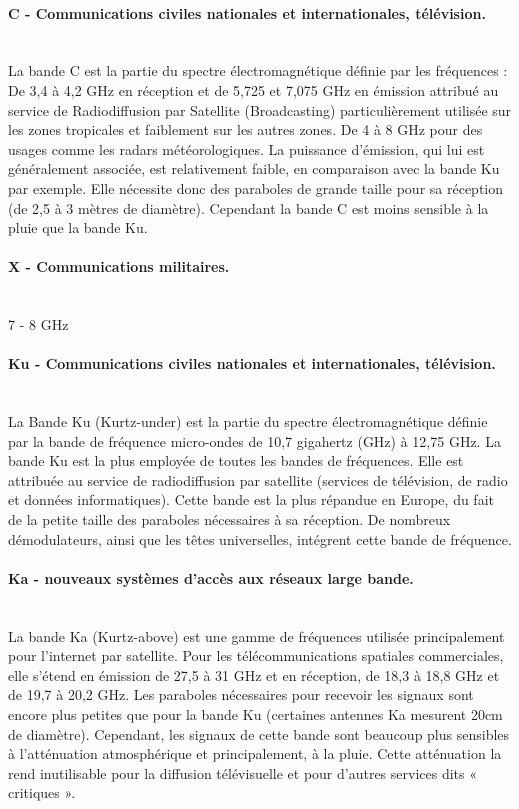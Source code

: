        \paragraph{C - Communications civiles nationales et internationales, télévision.}\\
            La bande C est la partie du spectre électromagnétique définie par les fréquences :
                De 3,4 à 4,2 GHz en réception et de 5,725 et 7,075 GHz en émission attribué au service de Radiodiffusion par Satellite (Broadcasting) particulièrement utilisée sur les zones tropicales et faiblement sur les autres zones.
                De 4 à 8 GHz pour des usages comme les radars météorologiques.
            La puissance d'émission, qui lui est généralement associée, est relativement faible, en comparaison avec la bande Ku par exemple. Elle nécessite donc des paraboles de grande taille pour sa réception (de 2,5 à 3 mètres de diamètre). Cependant la bande C est moins sensible à la pluie que la bande Ku.

        \paragraph{X - Communications militaires.}\\
        7  - 8 GHz  

        \paragraph{Ku - Communications civiles nationales et internationales, télévision.}\\
            La Bande Ku (Kurtz-under) est la partie du spectre électromagnétique définie par la bande de fréquence micro-ondes de 10,7 gigahertz (GHz) à 12,75 GHz. La bande Ku est la plus employée de toutes les bandes de fréquences.
            Elle est attribuée au service de radiodiffusion par satellite (services de télévision, de radio et données informatiques). Cette bande est la plus répandue en Europe, du fait de la petite taille des paraboles nécessaires à sa réception.
            De nombreux démodulateurs, ainsi que les têtes universelles, intégrent cette bande de fréquence.
                        
        \paragraph{Ka - nouveaux systèmes d’accès aux réseaux large bande.}\\
            La bande Ka (Kurtz-above) est une gamme de fréquences utilisée principalement pour l’internet par satellite. Pour les télécommunications spatiales commerciales, elle s’étend en émission de 27,5 à 31 GHz et en réception, de 18,3 à 18,8 GHz et de 19,7 à 20,2 GHz. Les paraboles nécessaires pour recevoir les signaux sont encore plus petites que pour la bande Ku (certaines antennes Ka mesurent 20cm de diamètre). Cependant, les signaux de cette bande sont beaucoup plus sensibles à l’atténuation atmosphérique et principalement, à la pluie. Cette atténuation la rend inutilisable pour la diffusion télévisuelle et pour d’autres services dits « critiques ».


